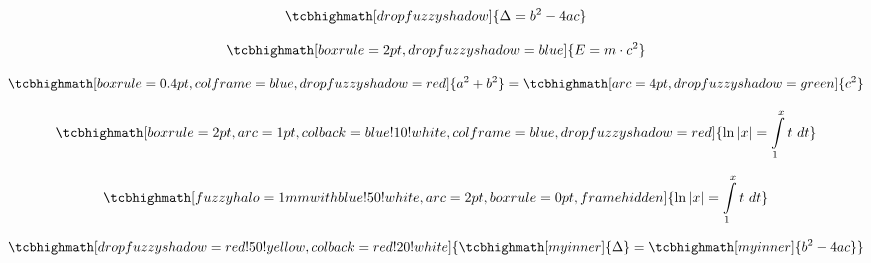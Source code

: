 \documentclass{article}
\begin{document}
\begin{equation}
\tcbhighmath[drop fuzzy shadow]{\Delta = b^2 - 4ac}
\end{equation}

\begin{equation}
\tcbhighmath[boxrule=2pt,drop fuzzy shadow=blue]{E = m\cdot c^2}
\end{equation}

\begin{equation}
\tcbhighmath[boxrule=0.4pt,colframe=blue,drop fuzzy shadow=red]{a^2 + b^2} =
\tcbhighmath[arc=4pt,drop fuzzy shadow=green]{c^2}
\end{equation}

\begin{equation}
\tcbhighmath[boxrule=2pt,arc=1pt,colback=blue!10!white,colframe=blue,
  drop fuzzy shadow=red]{ \ln|x| = \int\limits_1^x t~dt }
\end{equation}

\begin{equation}
\tcbhighmath[fuzzy halo=1mm with blue!50!white,arc=2pt,
  boxrule=0pt,frame hidden]{ \ln|x| = \int\limits_1^x t~dt }
\end{equation}

\begin{equation}
\tcbhighmath[drop fuzzy shadow=red!50!yellow,colback=red!20!white]{
  \tcbhighmath[myinner]{\Delta} =
  \tcbhighmath[myinner]{b^2 - 4ac}}
\end{equation}
\end{document}
